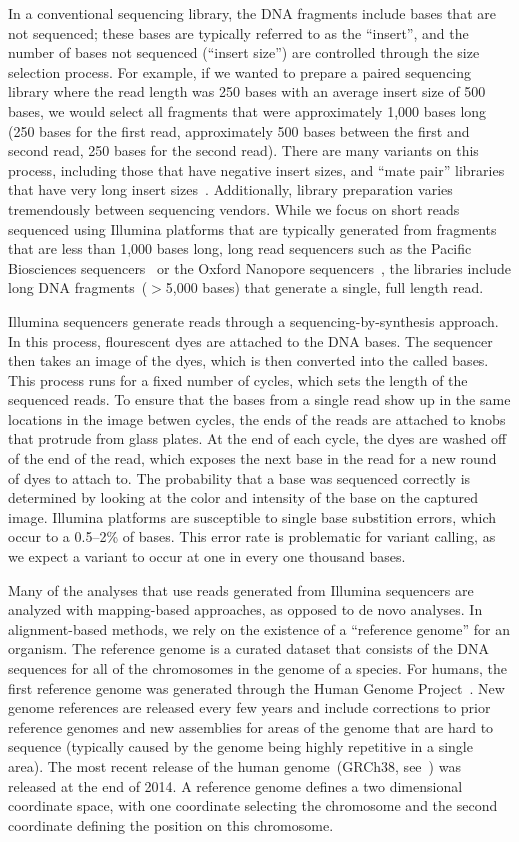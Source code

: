 \documentclass[phd]{ucbthesis}
\begin{document}
In a conventional sequencing library, the DNA fragments include bases that are
not sequenced; these bases are typically referred to as the ``insert'', and the
number of bases not sequenced (``insert size'') are controlled through the
size selection process. For example, if we wanted to prepare a paired sequencing
library where the read length was 250 bases with an average insert size of 500
bases, we would select all fragments that were approximately 1,000 bases long
(250 bases for the first read, approximately 500 bases between the first and
second read, 250 bases for the second read). There are many variants on this
process, including those that have negative insert sizes, and ``mate pair''
libraries that have very long insert sizes~\cite{mardis13}. Additionally,
library preparation varies tremendously between sequencing vendors. While we
focus on short reads sequenced using Illumina platforms that are typically
generated from fragments that are less than 1,000 bases long, long
read sequencers such as the Pacific Biosciences sequencers~\cite{eid09} or
the Oxford Nanopore sequencers~\cite{clarke09}, the libraries include long DNA
fragments~($>$5,000 bases) that generate a single, full length read.

Illumina sequencers generate reads through a sequencing-by-synthesis approach.
In this process, flourescent dyes are attached to the DNA bases. The sequencer
then takes an image of the dyes, which is then converted into the called bases.
This process runs for a fixed number of cycles, which sets the length of the
sequenced reads. To ensure that the bases from a single read show up in the same
locations in the image betwen cycles, the ends of the reads are attached to
knobs that protrude from glass plates. At the end of each cycle, the dyes are
washed off of the end of the read, which exposes the next base in the read for
a new round of dyes to attach to. The probability that a base was sequenced
correctly is determined by looking at the color and intensity of the base on
the captured image. Illumina platforms are susceptible to single base substition
errors, which occur to a 0.5--2\% of bases. This error rate is problematic for
variant calling, as we expect a variant to occur at one in every one thousand
bases.

Many of the analyses that use reads generated from Illumina sequencers are
analyzed with mapping-based approaches, as opposed to de novo analyses. In
alignment-based methods, we rely on
the existence of a ``reference genome'' for an organism. The reference genome is a curated
dataset that consists of the DNA sequences for all of the chromosomes in the
genome of a species. For humans, the first reference genome was generated
through the Human Genome Project~\cite{lander01}. New genome references are
released every few years and include corrections to prior reference genomes
and new assemblies for areas of the genome that are hard to sequence (typically
caused by the genome being highly repetitive in a single area). The most recent
release of the human genome~(GRCh38, see~\cite{church15}) was released at the
end of 2014. A reference genome defines a two dimensional coordinate space, with
one coordinate selecting the chromosome and the second coordinate defining the
position on this chromosome.
\end{document}
